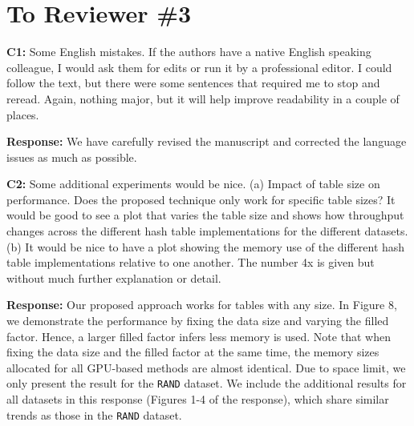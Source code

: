 \section*{To Reviewer \#3}

\begin{shaded}
	\noindent\textbf{C1:} Some English mistakes.  If the authors have a native English speaking colleague, I would ask them for edits or run it by a professional editor.  I could follow the text, but there were some sentences that required me to stop and reread.  Again, nothing major, but it will help improve readability in a couple of places.
\end{shaded}
%
\noindent\textbf{Response:} 
We have carefully revised the manuscript and corrected the language issues as much as possible. 

\begin{shaded}
	\noindent\textbf{C2:} Some additional experiments would be nice.
	(a) Impact of table size on performance.  Does the proposed technique only work for specific table sizes?  It would be good to see a plot that varies the table size and shows how throughput changes across the different hash table implementations for the different datasets.
	(b) It would be nice to have a plot showing the memory use of the different hash table implementations relative to one another.  The number 4x is given but without much further explanation or detail.
\end{shaded}
%
\noindent\textbf{Response:} 
Our proposed approach works for tables with any size. 
In Figure 8, we demonstrate the performance by fixing the data size and varying the filled factor. 
Hence, a larger filled factor infers less memory is used.
Note that when fixing the data size and the filled factor at the same time, the memory sizes allocated for all GPU-based methods are almost identical.  
Due to space limit, we only present the result for the {\tt RAND} dataset.
We include the additional results for all datasets in this response (Figures 1-4 of the response), which share similar trends as those in the {\tt RAND} dataset.

